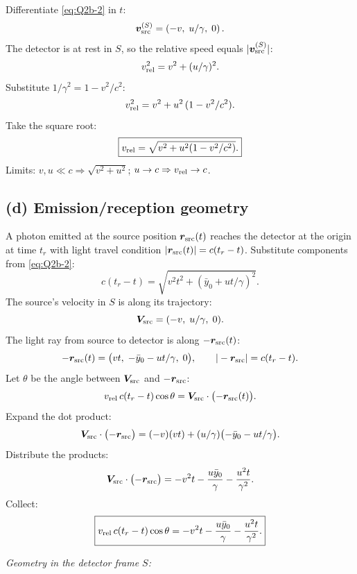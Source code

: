 \documentclass[11pt]{article}
\begin{document}
Differentiate \eqref{eq:Q2b-2} in $t$:
\[ \bm v_{\rm src}^{(S)} = \left(-v,\;u/\gamma,\;0\right). \]
The detector is at rest in $S$, so the relative speed equals $|\bm v_{\rm src}^{(S)}|$:
\[ v_{\rm rel}^2 = v^2 + (u/\gamma)^2. \]
Substitute $1/\gamma^2 = 1-v^2/c^2$:
\[ v_{\rm rel}^2 = v^2 + u^2\,(1-v^2/c^2). \]
Take the square root:
\begin{equation}
\boxed{v_{\rm rel} = \sqrt{v^2 + u^2(1-v^2/c^2)}.}
\label{eq:Q2c-2}
\end{equation}
Limits: $v,u\ll c\Rightarrow\sqrt{v^2+u^2}$; $u\to c\Rightarrow v_{\rm rel}\to c$.

\subsection*{(d) Emission/reception geometry}

A photon emitted at the source position $\bm r_{\rm src}(t)$ reaches the detector at the origin at time $t_r$ with light travel condition $|\bm r_{\rm src}(t)|=c(t_r-t)$. Substitute components from \eqref{eq:Q2b-2}:
\begin{equation}
\boxed{c(t_r-t) = \sqrt{v^2 t^2 + (\bar y_0 + ut/\gamma)^2}.}
\label{eq:Q2d-2}
\end{equation}
The source's velocity in $S$ is along its trajectory:
\[ \bm V_{\rm src} = (-v,\;u/\gamma,\;0). \]
The light ray from source to detector is along $-\bm r_{\rm src}(t)$:
\[ -\bm r_{\rm src}(t) = \bigl(vt,\;-\bar y_0 - ut/\gamma,\;0\bigr),\qquad |-\bm r_{\rm src}| = c(t_r-t). \]
Let $\theta$ be the angle between $\bm V_{\rm src}$ and $-\bm r_{\rm src}$:
\[ v_{\rm rel}\,c(t_r-t)\cos\theta = \bm V_{\rm src}\cdot\bigl(-\bm r_{\rm src}(t)\bigr). \]
Expand the dot product:
\[ \bm V_{\rm src}\cdot\bigl(-\bm r_{\rm src}\bigr) = (-v)(vt) + (u/\gamma)\bigl(-\bar y_0 - ut/\gamma\bigr). \]
Distribute the products:
\[ \bm V_{\rm src}\cdot\bigl(-\bm r_{\rm src}\bigr) = -v^2 t - \frac{u\bar y_0}{\gamma} - \frac{u^2 t}{\gamma^2}. \]
Collect:
\begin{equation}
\boxed{v_{\rm rel}\,c(t_r-t)\cos\theta = -v^2 t - \frac{u\bar y_0}{\gamma} - \frac{u^2 t}{\gamma^2}.}
\end{equation}

\medskip
\noindent\emph{Geometry in the detector frame $S$:}
\begin{center}
\end{center}
\end{document}
